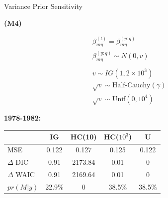 \documentclass[ xcolor = pdftex, dvipsnames, table ]{beamer}
\begin{document}
\begin{frame}{Variance Prior Sensitivity}
\hspace*{-1cm}
\begin{minipage}{0.39\textwidth}
	\begin{center}
	\textbf{(M4)}
	\end{center}
	\begin{eqnarray*}
	&\beta^{(t)}_{m\eta} = \beta^{(y:q)}_{m\eta}&\\
	&\beta^{(y:q)}_{m\eta} \sim N(0, v)&\\
	&&\\
	&v       \sim IG(1, 2\times10^3)&\\
	&\sqrt{v} \sim \text{Half-Cauchy}(\gamma)&\\ %
	&\sqrt{v} \sim \text{Unif}(0, 10^4)&
	\end{eqnarray*}
\end{minipage}
\begin{minipage}{0.49\textwidth}
	\textbf{1978-1982:}\\
	\begin{tabular}{lcccc}
	\hline
			& IG      & HC(10) 	& HC($10^3$) 	& U 	\\ \hline
	MSE		& 0.122   &  0.127	& 0.125 	& 0.122 \\
	$\Delta$ DIC	& 0.91    & 2173.84	& 0.01 		& 0	\\ %
	$\Delta$ WAIC	& 0.91    & 2169.64	& 0.01 		& 0	\\ %
	\(pr(M|y)\)	& 22.9\%  & 0  		& 38.5\%	& 38.5\%\\ \hline%
	\end{tabular}
\end{minipage}
\end{frame}
\end{document}
